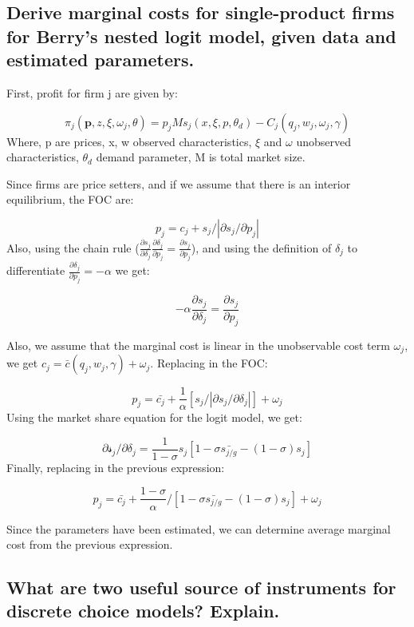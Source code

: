 \documentclass[]{article}
\begin{document}
\hypertarget{derive-marginal-costs-for-single-product-firms-for-berrys-nested-logit-model-given-data-and-estimated-parameters.}{%
\subsection{Derive marginal costs for single-product firms for Berry's
nested logit model, given data and estimated
parameters.}\label{derive-marginal-costs-for-single-product-firms-for-berrys-nested-logit-model-given-data-and-estimated-parameters.}}

First, profit for firm j are given by:

\[\pi_j(\mathbf{p}, z, \xi , \omega_j, \theta) = p_j M s_j(x, \xi, p, \theta_d) - C_j(q_j, w_j, \omega_j, \gamma)\]
Where, p are prices, x, w observed characteristics, \(\xi\) and
\(\omega\) unobserved characteristics, \(\theta_d\) demand parameter, M
is total market size.

Since firms are price setters, and if we assume that there is an
interior equilibrium, the FOC are:

\[p_j = c_j + s_j/|\partial s_j/ \partial p_j| \] Also, using the chain
rule
(\(\frac{\partial s_j}{\partial \delta_j}\frac{\partial \delta_j}{\partial p_j} = \frac{\partial s_j}{\partial p_j}\)),
and using the definition of \(\delta_j\) to differentiate
\(\frac{\partial \delta_j}{\partial p_j} = -\alpha\) we get:

\[- \alpha \frac{\partial s_j}{\partial \delta_j} = \frac{\partial s_j}{\partial p_j} \]

Also, we assume that the marginal cost is linear in the unobservable
cost term \(\omega_j\), we get
\(c_j = \bar{c}(q_j, w_j, \gamma) + \omega_j\). Replacing in the FOC:

\[ p_j = \bar{c_j} + \frac{1}{\alpha}[s_j/|\partial s_j/ \partial \delta_j|] + \omega_j \]
Using the market share equation for the logit model, we get:

\[ \partial \mathcal{s}_j/ \partial \delta_j = \frac{1}{1-\sigma}s_j[1 - \sigma \bar{s_{j/g}}-(1-\sigma)s_j]\]
Finally, replacing in the previous expression:

\[ 
p_j = \bar{c_j} + \frac{1-\sigma}{\alpha}/[1 - \sigma \bar{s_{j/g}}-(1-\sigma)s_j] + \omega_j
\]

Since the parameters have been estimated, we can determine average
marginal cost from the previous expression.

\hypertarget{what-are-two-useful-source-of-instruments-for-discrete-choice-models-explain.}{%
\subsection{What are two useful source of instruments for discrete
choice models?
Explain.}\label{what-are-two-useful-source-of-instruments-for-discrete-choice-models-explain.}}
\end{document}
